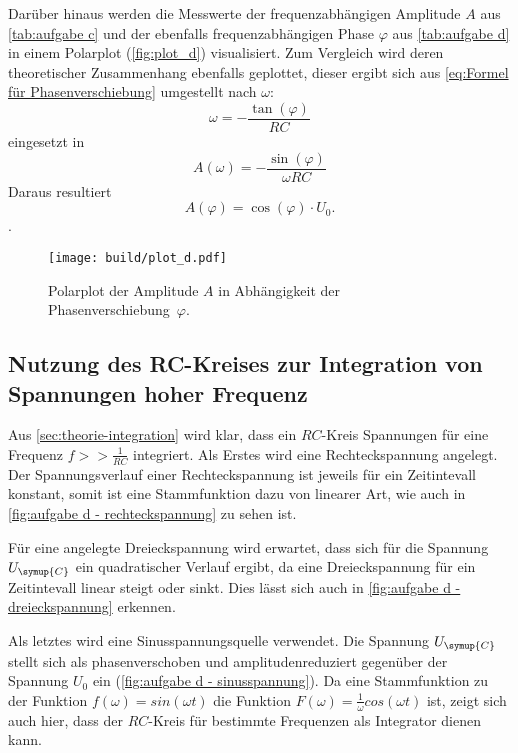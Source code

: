 Darüber hinaus werden die Messwerte der frequenzabhängigen Amplitude $A$ aus \autoref{tab:aufgabe c} und der
ebenfalls frequenzabhängigen Phase $\varphi$ aus \autoref{tab:aufgabe d} in einem Polarplot (\autoref{fig:plot_d})
visualisiert.
Zum Vergleich wird deren theoretischer Zusammenhang ebenfalls geplottet, dieser ergibt sich aus \autoref{eq:Formel für Phasenverschiebung}
umgestellt nach $\omega$:
\begin{equation}
  \omega = -\frac{\tan(\varphi)}{RC}
\end{equation}
eingesetzt in
\begin{equation}
  A(\omega) = -\frac{\sin(\varphi)}{\omega RC}
\end{equation}
Daraus resultiert
\begin{equation}
  A(\varphi) = \cos (\varphi) \cdot U_{0}.
\end{equation}.


\begin{figure} [H]
  \centering
  \texttt{[image: build/plot\_d.pdf]}
  \caption{Polarplot der Amplitude $A$ in Abhängigkeit der Phasenverschiebung~$\varphi$.}
  \label{fig:plot_d}
\end{figure}

\subsection{Nutzung des RC-Kreises zur Integration von Spannungen hoher Frequenz}
Aus \autoref{sec:theorie-integration} wird klar, dass ein $RC$-Kreis Spannungen für eine Frequenz $f >> \frac{1}{RC}$
integriert. Als Erstes wird eine Rechteckspannung angelegt. Der Spannungsverlauf einer Rechteckspannung ist jeweils für ein
Zeitintevall konstant, somit ist eine Stammfunktion dazu von linearer Art, wie auch in \autoref{fig:aufgabe d - rechteckspannung}
zu sehen ist.

Für eine angelegte Dreieckspannung wird erwartet, dass sich für die Spannung $U_{\symup{C}}$ ein quadratischer Verlauf ergibt,
da eine Dreieckspannung für ein Zeitintevall linear steigt oder sinkt. Dies lässt sich auch in \autoref{fig:aufgabe d - dreieckspannung}
erkennen.

Als letztes wird eine Sinusspannungsquelle verwendet. Die Spannung $U_{\symup{C}}$ stellt sich als phasenverschoben
und amplitudenreduziert gegenüber der Spannung $U_{0}$ ein (\autoref{fig:aufgabe d - sinusspannung}). Da eine
Stammfunktion zu der Funktion $f(\omega)=sin(\omega t)$ die Funktion $F(\omega) = \frac{1}{\omega}cos(\omega t)$ ist,
zeigt sich auch hier, dass der $RC$-Kreis für bestimmte Frequenzen als Integrator dienen kann.

